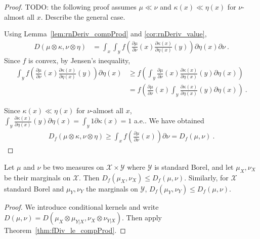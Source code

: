 \begin{proof}
TODO: the following proof assumes $\mu \ll \nu$ and $\kappa(x) \ll \eta(x)$ for $\nu$-almost all $x$. Describe the general case.

Using Lemma~\ref{lem:rnDeriv_compProd} and \ref{cor:rnDeriv_value},
\begin{align*}
D(\mu \otimes \kappa, \nu \otimes \eta)
&= \int_x \int_y f \left( \frac{\partial \mu}{\partial\nu}(x) \frac{\partial \kappa(x)}{\partial\eta(x)}(y) \right) \partial \eta(x) \partial \nu
\: .
\end{align*}
Since $f$ is convex, by Jensen's inequality,
\begin{align*}
\int_y f \left( \frac{\partial \mu}{\partial\nu}(x) \frac{\partial \kappa(x)}{\partial\eta(x)}(y) \right) \partial \eta(x)
&\ge f \left( \int_y \frac{\partial \mu}{\partial\nu}(x) \frac{\partial \kappa(x)}{\partial\eta(x)}(y) \partial \eta(x) \right)
\\
&= f \left( \frac{\partial \mu}{\partial\nu}(x) \int_y \frac{\partial \kappa(x)}{\partial\eta(x)}(y) \partial \eta(x) \right)
\: .
\end{align*}

Since $\kappa(x) \ll \eta(x)$ for $\nu$-almost all $x$, $\int_y \frac{\partial \kappa(x)}{\partial\eta(x)}(y) \partial \eta(x) = \int_y 1 \partial \kappa(x) = 1$ a.e.. We have obtained
\begin{align*}
D_f(\mu \otimes \kappa, \nu \otimes \eta)
\ge \int_x f \left( \frac{\partial \mu}{\partial\nu}(x)\right) \partial \nu
= D_f(\mu, \nu)
\: .
\end{align*}
\end{proof}

\begin{theorem}[Marginals]
  \label{thm:fDiv_fst_le}
  Let $\mu$ and $\nu$ be two measures on $\mathcal X \times \mathcal Y$ where $\mathcal Y$ is standard Borel, and let $\mu_X, \nu_X$ be their marginals on $\mathcal X$.
  Then $D_f(\mu_X, \nu_X) \le D_f(\mu, \nu)$.
  Similarly, for $\mathcal X$ standard Borel and $\mu_Y, \nu_Y$ the marginals on $\mathcal Y$, $D_f(\mu_Y, \nu_Y) \le D_f(\mu, \nu)$.
\end{theorem}

\begin{proof}
We introduce conditional kernels and write $D(\mu, \nu) = D(\mu_X \otimes \mu_{Y|X}, \nu_X \otimes \nu_{Y|X})$. Then apply Theorem~\ref{thm:fDiv_le_compProd}.
\end{proof}

